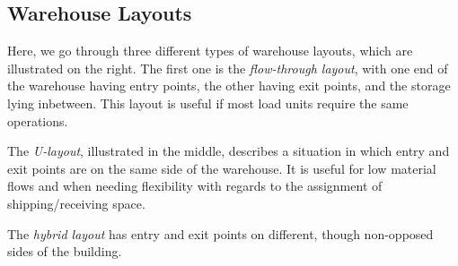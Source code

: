 \documentclass[english]{panikzettel}
\begin{document}
\subsection{Warehouse Layouts}
\begin{halfboxl}
    Here, we go through three different types of warehouse layouts, which are illustrated on the right.
    The first one is the \emph{flow-through layout}, with one end of the warehouse having entry points, the other having exit points, and the storage lying inbetween. This layout is useful if most load units require the same operations.

    The \emph{U-layout}, illustrated in the middle, describes a situation in which entry and exit points are on the same side of the warehouse. It is useful for low material flows and when needing flexibility with regards to the assignment of shipping/receiving space.

    The \emph{hybrid layout} has entry and exit points on different, though non-opposed sides of the building.
\end{halfboxl}%
\end{document}
